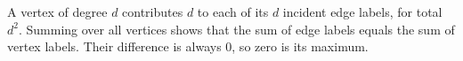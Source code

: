 A vertex of degree $d$ contributes $d$ to each of its $d$ incident edge labels, for total $d^2$. Summing over all vertices shows that the sum of edge labels equals the sum of vertex labels. Their difference is always $\boxed0$, so zero is its maximum.
